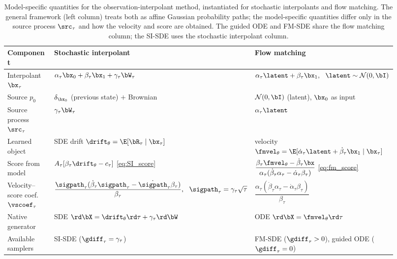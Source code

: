 \begin{table}[ht]
    \centering
    \caption{Model-specific quantities for the observation-interpolant method, instantiated for stochastic interpolants and flow matching. The general framework (left column) treats both as affine Gaussian probability paths; the model-specific quantities differ only in the source process $\src_\tau$ and how the velocity and score are obtained. The guided ODE and FM-SDE share the flow matching column; the SI-SDE uses the stochastic interpolant column.}
    \label{tab:si_vs_fm}
    \small
    \begin{tabular}{p{0.235\linewidth}|p{0.345\linewidth}|p{0.345\linewidth}}
        \toprule
        \textbf{Component} & \textbf{Stochastic interpolant} & \textbf{Flow matching} \\
        \midrule
        Interpolant $\bx_\tau$
            & $\alpha_\tau\bx_0 + \beta_\tau\bx_1 + \gamma_\tau\bW_\tau$
            & $\alpha_\tau\latent + \beta_\tau\bx_1,\ \ \latent\sim\mathcal{N}(0,\bI)$ \\
        Source $p_0$
            & $\delta_{\bx_0}$ (previous state) $+$ Brownian
            & $\mathcal{N}(0,\bI)$ (latent), $\bx_0$ as input \\
        Source process $\src_\tau$
            & $\gamma_\tau\bW_\tau$
            & $\alpha_\tau\latent$ \\
        Learned object
            & SDE drift $\drift_\theta=\E[\bR_\tau\mid\bx_\tau]$
            & velocity $\fmvel_\theta=\E[\dot\alpha_\tau\latent+\dot\beta_\tau\bx_1\mid\bx_\tau]$ \\
        Score from model
            & $A_\tau[\beta_\tau\drift_\theta - c_\tau]$ \eqref{eq:SI_score}
            & $\dfrac{\beta_\tau\fmvel_\theta-\dot\beta_\tau\bx}{\alpha_\tau(\dot\beta_\tau\alpha_\tau-\dot\alpha_\tau\beta_\tau)}$ \eqref{eq:fm_score} \\
        Velocity--score coef.\ $\vscoef_\tau$
            & $\dfrac{\sigpath_\tau(\dot\beta_\tau\sigpath_\tau-\dot\sigpath_\tau\beta_\tau)}{\beta_\tau},\ \ \sigpath_\tau=\gamma_\tau\sqrt\tau$
            & $\dfrac{\alpha_\tau(\dot\beta_\tau\alpha_\tau-\dot\alpha_\tau\beta_\tau)}{\beta_\tau}$ \\
        Native generator
            & SDE $\rd\bX=\drift_\theta\rd\tau+\gamma_\tau\rd\bW$
            & ODE $\rd\bX=\fmvel_\theta\rd\tau$ \\
        Available samplers
            & SI-SDE ($\gdiff_\tau=\gamma_\tau$)
            & FM-SDE ($\gdiff_\tau>0$), guided ODE ($\gdiff_\tau=0$) \\

\end{tabular}
\end{table}
